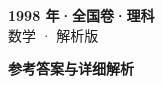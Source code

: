 \documentclass[zihao=-4, a4paper]{ctexart}
\begin{document}
\begin{center}
  {\Large\bfseries 1998 年·全国卷·理科}\\[4pt]
  {\large 数学 · 解析版}
\end{center}
\medskip
{}

\clearpage
{}
\begin{center}{\Large\bfseries 参考答案与详细解析}\end{center}
\medskip

\end{document}
